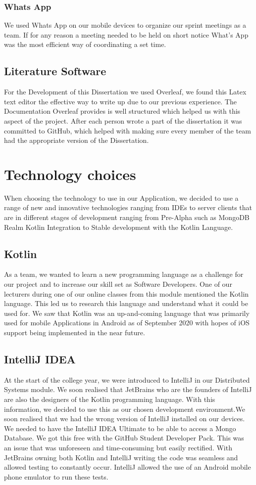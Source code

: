 \subsubsection{Whats App}
We used Whats App on our mobile devices to organize our sprint meetings as a team. If for any reason a meeting needed to be held on short notice What's App was the most efficient way of coordinating a set time.
\subsection{Literature Software}
For the Development of this Dissertation we used Overleaf, we found this Latex text editor the effective way to write up due to our previous experience. The Documentation Overleaf provides is well structured which helped us with this aspect of the project. After each person wrote a part of the dissertation it was committed to GitHub, which helped with making sure every member of the team had the appropriate version of the Dissertation.

\section{Technology choices}
When choosing the technology to use in our Application, we decided to use a range of new and innovative technologies ranging from IDEs to server clients that are in different stages of development ranging from Pre-Alpha such as MongoDB Realm Kotlin Integration to Stable development with the Kotlin Language.
\subsection{Kotlin}
As a team, we wanted to learn a new programming language as a challenge for our project and to increase our skill set as Software Developers. One of our lecturers during one of our online classes from this module mentioned the Kotlin language. This led us to research this language and understand what it could be used for. We saw that Kotlin was an up-and-coming language that was primarily used for mobile Applications in Android as of September 2020 with hopes of iOS support being implemented in the near future.
\subsection{IntelliJ IDEA}
At the start of the college year, we were introduced to IntelliJ in our Distributed Systems module. We soon realised that JetBrains who are the founders of IntelliJ are also the designers of the Kotlin programming language. With this information, we decided to use this as our chosen development environment.We soon realised that we had the wrong version of IntelliJ installed on our devices. We needed to have the IntelliJ IDEA Ultimate to be able to access a Mongo Database. We got this free with the GitHub Student Developer Pack. This was an issue that was unforeseen and time-consuming but easily rectified. With JetBrains owning both Kotlin and IntelliJ writing the code was seamless and allowed testing to constantly occur. IntelliJ allowed the use of an Android mobile phone emulator to run these tests.
